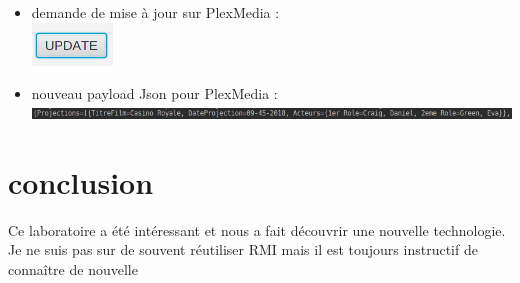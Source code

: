 \documentclass[a4paper]{article}
\begin{document}
\begin{itemize}
 \item demande de mise à jour sur PlexMedia :\\ 
 \includegraphics[scale=0.5]{updatePlexMedia.png}
 \item nouveau payload Json pour PlexMedia :\\ 
 \includegraphics[scale=0.5]{PayloadJson.png}
\end{itemize}

\section{conclusion}
Ce laboratoire a été intéressant et nous a fait découvrir une nouvelle technologie. Je ne suis pas sur de souvent réutiliser RMI mais il est toujours instructif de connaître de nouvelle
\end{document}
